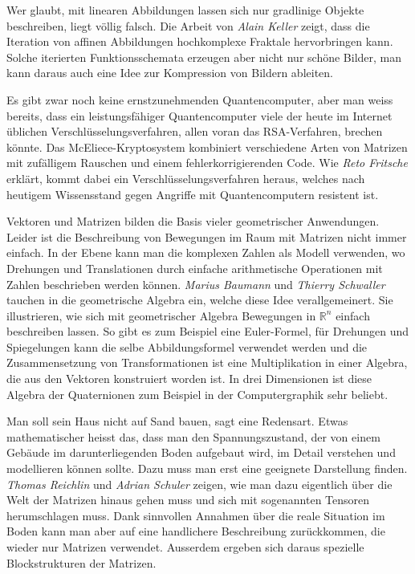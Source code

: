Wer glaubt, mit linearen Abbildungen lassen sich nur gradlinige
Objekte beschreiben, liegt völlig falsch.
Die Arbeit von {\em Alain Keller} zeigt, dass die Iteration von
%
affinen Abbildungen hochkomplexe Fraktale hervorbringen kann.
Solche iterierten Funktionsschemata erzeugen aber nicht nur schöne
Bilder, man kann daraus auch eine Idee zur Kompression von
Bildern ableiten.

Es gibt zwar noch keine ernstzunehmenden Quantencomputer, aber man weiss
bereits, dass ein leistungsfähiger Quantencomputer viele der heute
im Internet üblichen Verschlüsselungsverfahren, allen voran das RSA-Verfahren,
brechen könnte.
Das McEliece-Kryptosystem kombiniert verschiedene Arten von Matrizen
mit zufälligem Rauschen und einem fehlerkorrigierenden Code.
Wie {\em Reto Fritsche} erklärt, kommt dabei ein Verschlüsselungsverfahren
%
heraus, welches nach heutigem Wissensstand gegen Angriffe mit
Quantencomputern resistent ist.

Vektoren und Matrizen bilden die Basis vieler geometrischer
Anwendungen.
Leider ist die Beschreibung von Bewegungen im Raum mit Matrizen nicht
immer einfach.
In der Ebene kann man die komplexen Zahlen als Modell verwenden,
wo Drehungen und Translationen durch einfache arithmetische
Operationen mit Zahlen beschrieben werden können.
{\em Marius Baumann} und {\em Thierry Schwaller} tauchen in die
%
%
geometrische Algebra ein, welche diese Idee verallgemeinert.
Sie illustrieren, wie sich mit geometrischer Algebra Bewegungen
in $\mathbb{R}^n$ einfach beschreiben lassen.
So gibt es zum Beispiel eine Euler-Formel, für Drehungen und Spiegelungen
kann die selbe Abbildungsformel verwendet werden und die Zusammensetzung
von Transformationen ist eine Multiplikation in einer Algebra, die
aus den Vektoren konstruiert worden ist.
In drei Dimensionen ist diese Algebra der Quaternionen zum Beispiel
in der Computergraphik sehr beliebt.

Man soll sein Haus nicht auf Sand bauen, sagt eine Redensart.
Etwas mathematischer heisst das, dass man den Spannungszustand,
der von einem Gebäude im darunterliegenden Boden aufgebaut wird,
im Detail verstehen und modellieren können sollte.
Dazu muss man erst eine geeignete Darstellung finden.
{\em Thomas Reichlin} und {\em Adrian Schuler} zeigen, wie man 
%
%
dazu eigentlich über die Welt der Matrizen hinaus gehen muss und
sich mit sogenannten Tensoren herumschlagen muss.
Dank sinnvollen Annahmen über die reale Situation im Boden
kann man aber auf eine handlichere Beschreibung zurückkommen,
die wieder nur Matrizen verwendet.
Ausserdem ergeben sich daraus spezielle Blockstrukturen der
Matrizen.

